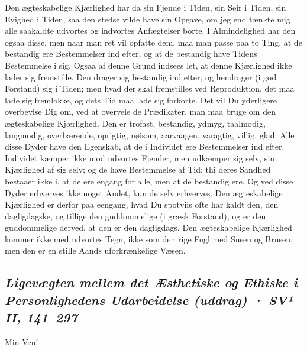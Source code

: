 \documentclass[12pt,a4paper]{article}
\newcommand{\sectionheading}[1]{\subsection*{\normalfont\itshape #1}}
\begin{document}
Den ægteskabelige Kjærlighed har da sin Fjende i Tiden, sin Seir i Tiden, sin Evighed i Tiden, saa den stedse vilde have sin Opgave, om jeg end tænkte mig alle saakaldte udvortes og indvortes Anfægtelser borte. I Almindelighed har den ogsaa disse, men naar man ret vil opfatte dem, maa man passe paa to Ting, at de bestandig ere Bestemmelser ind efter, og at de bestandig have Tidens Bestemmelse i sig. Ogsaa af denne Grund indsees let, at denne Kjærlighed ikke lader sig fremstille. Den drager sig bestandig ind efter, og hendrager (i god Forstand) sig i Tiden; men hvad der skal fremstilles ved Reproduktion, det maa lade sig fremlokke, og dets Tid maa lade sig forkorte. Det vil Du yderligere overbevise Dig om, ved at overveie de Prædikater, man maa bruge om den ægteskabelige Kjærlighed. Den er trofast, bestandig, ydmyg, taalmodig, langmodig, overbærende, oprigtig, nøisom, aarvaagen, varagtig, villig, glad. Alle disse Dyder have den Egenskab, at de i Individet ere Bestemmelser ind efter. Individet kæmper ikke mod udvortes Fjender, men udkæmper sig selv, sin Kjærlighed af sig selv; og de have Bestemmelse af Tid; thi deres Sandhed bestaaer ikke i, at de ere engang for alle, men at de bestandig ere. Og ved disse Dyder erhverves ikke noget Andet, kun de selv erhverves. Den ægteskabelige Kjærlighed er derfor paa eengang, hvad Du spotviis ofte har kaldt den, den dagligdagske, og tillige den guddommelige (i græsk Forstand), og er den guddommelige derved, at den er den dagligdags. Den ægteskabelige Kjærlighed kommer ikke med udvortes Tegn, ikke som den rige Fugl med Susen og Brusen, men den er en stille Aands uforkrænkelige Væsen.

\sectionheading{Ligevægten mellem det Æsthetiske og Ethiske i Personlighedens Udarbeidelse (uddrag)  ·  SV¹ II, 141–297}

Min Ven!
\end{document}
